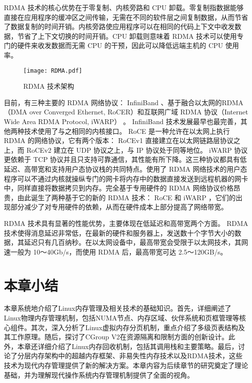  RDMA 技术的核心优势在于零复制、内核旁路和 CPU 卸载。零复制指数据能够直接在应用程序的缓冲区之间传输，无需在不同的软件层之间复制数据，从而节省了数据复制的时间开销。内核旁路使应用程序可以在相同的代码上下文中收发数据，节省了上下文切换的时间开销。CPU 卸载则意味着 RDMA 技术可以使用专门的硬件来收发数据而无需 CPU 的干预，因此可以降低远端主机的 CPU 使用率。

\begin{figure}[htb]
    \centering
    \texttt{[image: RDMA.pdf]}
    \caption{RDMA 技术架构}
    \label{fig:RDMA}
\end{figure}

目前，有三种主要的 RDMA 网络协议： InfiniBand 、基于融合以太网的RDMA（DMA over Converged Ethernet, RoCER）和互联网广域 RDMA 协议（Internet Wide Area RDMA Protocol, iWARP） 。 InfiniBand 技术发展最早也最完善，其他两种技术使用了与之相同的内核接口。 RoCE 是一种允许在以太网上执行 RDMA 的网络协议，它有两个版本： RoCEv1 直接建立在以太网链路层协议之上，而 RoCEv2 建立在 UDP 协议之上，与 IP 协议处于同等地位。 iWARP 协议更依赖于 TCP 协议并且只支持可靠通信，其性能有所下降。这三种协议都具有低延迟、高带宽和支持用户态协议栈的共同特点。使用了 RDMA 网络技术的用户态程序可以不通过内核就操纵专门的网卡将内存中的数据直接发送到远程机器的网卡中，同样直接将数据拷贝到内存。完全基于专用硬件的 RDMA 网络协议价格昂贵，由此诞生了两种基于它的新的 RDMA 技术： RoCE 和 iWARP ，它们的出现部分减少了对专用硬件的依赖，从而在硬件成本上部分提高了网络带宽。

 RDMA 技术具有显著的性能优势，主要体现在低延迟和高带宽两个方面。 RDMA 技术使得消息延迟非常低，在最新的硬件和服务器上，发送数十个字节大小的数据，其延迟只有几百纳秒。在以太网设备中，最高带宽会受限于以太网技术，其网速一般为 10～40Gb/s，而使用 RDMA 后，最高带宽可达 2.5～120GB/s。

\section{本章小结}

本章系统地介绍了Linux内存管理及相关技术的基础知识。首先，详细阐述了Linux物理内存管理机制，包括NUMA节点、内存区域、伙伴系统和页框管理等核心组件。其次，深入分析了Linux虚拟内存分页机制，重点介绍了多级页表结构及其工作原理。随后，探讨了CGroup V2在资源隔离和限制方面的创新设计。此外，本章还详细介绍了Linux内存回收机制，包括其调用栈和主要策略。最后，讨论了分层内存架构中的超越内存框架、非易失性内存技术以及RDMA技术，这些技术为现代内存管理提供了新的解决方案。本章内容为后续章节的研究奠定了理论基础，并为理解现代操作系统内存管理机制提供了全面的视角。